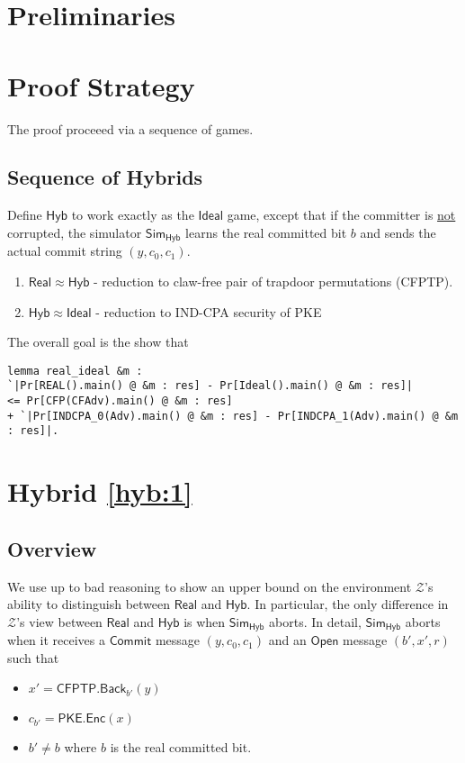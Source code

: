 \documentclass{article}[11pt]
\newcommand{\Sim}{{\mathsf{Sim}}} %
\newcommand{\Environment}{{\mathcal{Z}}} %
\newcommand{\Ideal}{{\mathsf{Ideal}}}
\newcommand{\Hyb}{{\mathsf{Hyb}}}
\newcommand{\Real}{{\mathsf{Real}}}
\newcommand{\OpenMsg}{\mathsf{Open}}
\newcommand{\CommitMsg}{\mathsf{Commit}}
\newcommand{\PKE}{\mathsf{PKE}}
\newcommand{\Enc}{\mathsf{Enc}}
\newcommand{\CFPTP}{\mathsf{CFPTP}}
\newcommand{\Back}{\mathsf{Back}}
\begin{document}
\section{Preliminaries}

\section{Proof Strategy}
The proof proceeed via a sequence of games.

\subsection{Sequence of Hybrids}
Define $\Hyb$ to work exactly as the $\Ideal$ game, except that if the committer is \underline{not} corrupted, the simulator $\Sim_{\Hyb}$ learns the real committed bit $b$ and sends the actual commit string $(y, c_0, c_1)$.
\begin{enumerate}
	\item\label{hyb:1} $\Real \approx \Hyb$ - reduction to claw-free pair of trapdoor permutations (CFPTP).
	\item\label{hyb:2} $\Hyb \approx \Ideal$ - reduction to IND-CPA security of PKE
\end{enumerate}

The overall goal is the show that
\begin{lstlisting}
lemma real_ideal &m :
`|Pr[REAL().main() @ &m : res] - Pr[Ideal().main() @ &m : res]|
<= Pr[CFP(CFAdv).main() @ &m : res]
+ `|Pr[INDCPA_0(Adv).main() @ &m : res] - Pr[INDCPA_1(Adv).main() @ &m : res]|.
\end{lstlisting}

\section{Hybrid \ref{hyb:1}}

\subsection{Overview}
We use up to bad reasoning to show an upper bound on the environment $\Environment$'s ability to distinguish between $\Real$ and $\Hyb$. In particular, the only difference in $\Environment$'s view between $\Real$ and $\Hyb$ is when $\Sim_\Hyb$ aborts. In detail, $\Sim_\Hyb$ aborts when it receives a $\CommitMsg$ message $(y, c_0, c_1)$ and an $\OpenMsg$ message $(b', x', r)$ such that
\begin{itemize}
	\item $x' = \CFPTP.\Back_{b'}(y)$
	\item $c_{b'} = \PKE.\Enc(x)$
	\item $b' \ne b$ where $b$ is the real committed bit.
\end{itemize}
\end{document}
